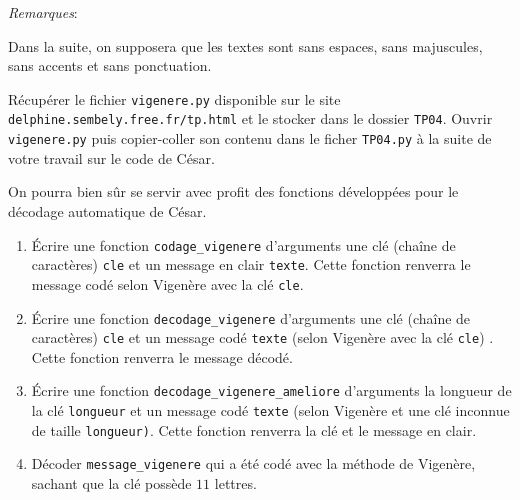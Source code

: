 \documentclass[t,11pt]{article}
\newcommand{\site}{\texttt{delphine.sembely.free.fr/tp.html} }
\begin{document}
\emph{Remarques}:
\begin{dinglist}{72}
\item Dans la suite, on supposera que les textes sont sans espaces, sans majuscules, sans accents et sans ponctuation.
\item Récupérer le fichier \texttt{vigenere.py} disponible sur le site \site et le stocker dans le dossier \texttt{TP04}. Ouvrir \texttt{vigenere.py} puis copier-coller son contenu dans le ficher \texttt{TP04.py} à la suite de votre travail sur le code de César.
\item On pourra bien sûr se servir avec profit des fonctions développées pour le décodage automatique de César.
\end{dinglist}

\bigskip
\begin{enumerate}
\item \'Ecrire une fonction \texttt{codage\_vigenere} d'arguments une clé (chaîne de caractères) \texttt{cle} et un message en clair \texttt{texte}. Cette fonction renverra le message codé selon Vigenère avec la clé \texttt{cle}.
\item \'Ecrire une fonction \texttt{decodage\_vigenere} d'arguments une clé (chaîne de caractères) \texttt{cle} et un message codé \texttt{texte} (selon Vigenère avec la clé \texttt{cle}) . Cette fonction renverra le message décodé.
\item \'Ecrire une fonction \texttt{decodage\_vigenere\_ameliore} d'arguments la longueur de la clé \texttt{longueur} et un message codé \texttt{texte} (selon Vigenère et une clé inconnue de taille \texttt{longueur)}. Cette fonction renverra la clé et le message en clair.
\item Décoder \texttt{message\_vigenere} qui a été codé avec la méthode de Vigenère, sachant que la clé possède $11$ lettres.%

\end{enumerate}
\end{document}
